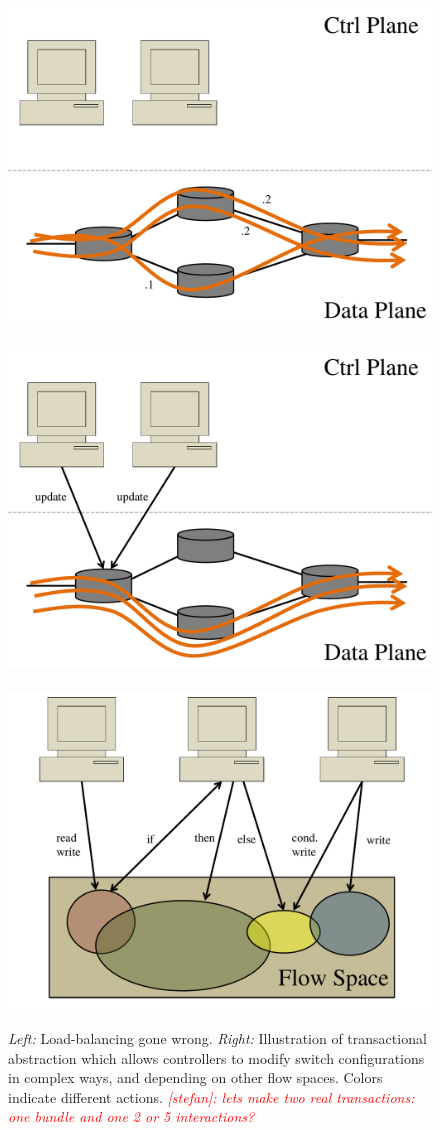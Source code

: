 \documentclass[conference]{sigcomm-alternate}
\newcommand{\stefan}[1]{\textit{\textcolor{red}{[stefan]: #1}}} %
\begin{document}
%

\begin{figure}[t]
\centering
\includegraphics[width=0.35\columnwidth]{loadbal-before.pdf}~\includegraphics[width=0.35\columnwidth]{loadbal.pdf}~~
\includegraphics[width=0.8\columnwidth]{pic.pdf}\\
\caption{\emph{Left:} Load-balancing gone wrong. \emph{Right:} Illustration of transactional abstraction which  allows
controllers to modify switch configurations in complex ways,
and
depending on other flow spaces. Colors indicate different actions. \stefan{lets make two real transactions: one bundle and one 2 or 5 interactions?}}\label{fig:illu}
\end{figure}
\end{document}
